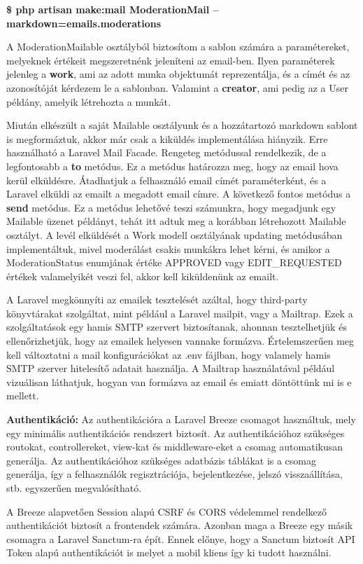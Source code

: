     \textbf{ \$ php artisan make:mail ModerationMail  --markdown=emails.moderations}

A ModerationMailable osztályból biztosítom a sablon számára a paramétereket, melyeknek értékeit megszeretnénk jeleníteni az email-ben. Ilyen paraméterek jelenleg a \textbf{work}, ami az adott munka objektumát reprezentálja, és a címét és az azonosítóját kérdezem le a sablonban. Valamint a \textbf{creator}, ami pedig az a User példány, amelyik létrehozta a munkát.

Miután elkészült a saját Mailable osztályunk és a hozzátartozó markdown sablont is megformáztuk, akkor már csak a kiküldés implementálása hiányzik. Erre használható a Laravel Mail Facade. Rengeteg metódussal rendelkezik, de a legfontosabb a \textbf{to} metódus. Ez a metódus határozza meg, hogy az email hova kerül elküldésre. Átadhatjuk a felhasználó email címét paraméterként, és a Laravel elküldi az emailt a megadott email címre. A következő fontos metódus a \textbf{send} metódus. Ez a metódus lehetővé teszi számunkra, hogy megadjunk egy Mailable üzenet példányt, tehát itt adtuk meg a korábban létrehozott Mailable osztályt.
A levél elküldését a Work modell osztályának updating metódusában implementáltuk, mivel moderálást csakis munkákra lehet kérni, és amikor a ModerationStatus enumjának értéke APPROVED vagy EDIT\_REQUESTED értékek valamelyikét veszi fel, akkor kell kiküldenünk az emailt.

A Laravel megkönnyíti az emailek tesztelését azáltal, hogy third-party könyvtárakat szolgáltat, mint például a Laravel mailpit, vagy a Mailtrap. Ezek a szolgáltatások egy hamis SMTP szervert biztosítanak, ahonnan tesztelhetjük és ellenőrizhetjük, hogy az emailek helyesen vannak\-e formázva. Értelemszerűen meg kell változtatni a mail konfigurációkat az .env fájlban, hogy valamely hamis SMTP szerver hitelesítő adatait használja. A Mailtrap használatával például vizuálisan láthatjuk, hogyan van formázva az email és emiatt döntöttünk mi is e mellett.


\textbf{Authentikáció:} Az authentikációra a Laravel Breeze \cite{LaravelBreeze} csomagot használtuk, mely egy minimális authentikációs rendszert biztosít. Az authentikációhoz szükséges routokat, controllereket, view-kat és middleware-eket a csomag automatikusan generálja. Az authentikációhoz szükséges adatbázis táblákat is a csomag generálja, így a felhasználók regisztrációja, bejelentkezése, jelszó visszaállítása, stb. egyszerűen megvalósítható.

A Breeze alapvetően Session alapú CSRF és CORS védelemmel rendelkező authentikációt biztosít a frontendek számára. Azonban maga a Breeze egy másik csomagra a Laravel Sanctum-ra \cite{LaravelSanctum} épít. Ennek előnye, hogy a Sanctum biztosít API Token alapú authentikációt is melyet a mobil kliens így ki tudott használni.\\

